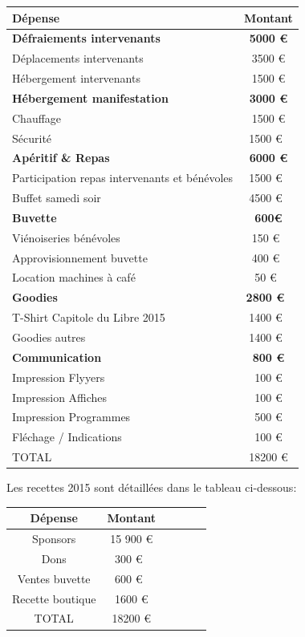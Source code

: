     \begin{tabular}{|l|c|}
        \hline Dépense & Montant \\
        \hline \textbf{Défraiements intervenants} & \textbf{5000 €} \\
        \hline Déplacements intervenants & 3500 € \\
        \hline Hébergement intervenants & 1500 € \\
        \hline \textbf{Hébergement manifestation} & \textbf{3000 €}\\
        \hline Chauffage & 1500 € \\
        \hline Sécurité & 1500 € \\
        \hline \textbf{Apéritif \& Repas} & \textbf{6000 € }\\
        \hline Participation repas intervenants et bénévoles & 1500 € \\
        \hline Buffet samedi soir & 4500 € \\
        \hline \textbf{Buvette} & \textbf{600€ }\\
        \hline Viénoiseries bénévoles & 150 € \\
        \hline Approvisionnement buvette & 400 € \\
        \hline Location machines à café & 50 € \\
        \hline \textbf{Goodies} & \textbf{2800 € }\\
        \hline T-Shirt Capitole du Libre 2015 & 1400 € \\
        \hline Goodies autres & 1400 € \\
        \hline \textbf{Communication} & \textbf{800 €} \\
        \hline Impression Flyyers & 100 € \\
        \hline Impression Affiches & 100 € \\
        \hline Impression Programmes & 500 € \\
        \hline Fléchage / Indications & 100 € \\
        \hline TOTAL & 18200 € \\
        \hline
    \end{tabular}

\Separateur

Les recettes 2015 sont détaillées dans le tableau ci-dessous:

    \begin{tabular}{|c|c|c|c|c|c|}
        \hline Dépense & Montant \\
        \hline Sponsors & 15 900 € \\
        \hline Dons & 300 € \\
        \hline Ventes buvette & 600 € \\
        \hline Recette boutique & 1600 € \\
        \hline TOTAL & 18200 € \\
        \hline
    \end{tabular}

